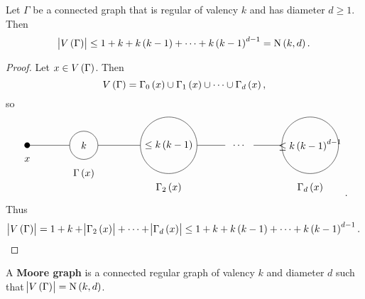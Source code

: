 \begin{proposition}
Let $ \Gamma $ be a connected graph that is regular of valency $ k $ and has diameter $ d \ge 1 $. Then
$$ \abs{V\br{\Gamma}} \le 1 + k + k\br{k - 1} + \dots + k\br{k - 1}^{d - 1} = \N\br{k, d}. $$
\end{proposition}

\begin{proof}
Let $ x \in V\br{\Gamma} $. Then
$$ V\br{\Gamma} = \Gamma_0\br{x} \cup \Gamma_1\br{x} \cup \dots \cup \Gamma_d\br{x}, $$
so
$$
\begin{tikzpicture}
\fill (0, 0) circle (0.1);
\draw (0, -0.5) node{$ x $};
\draw (2, 0) circle (0.5) node{$ k $};
\draw (2, -1) node{$ \Gamma\br{x} $};
\draw (5, 0) circle (1) node{$ \le k\br{k - 1} $};
\draw (5, -1.5) node{$ \Gamma_2\br{x} $};
\draw (7.5, 0) node{$ \dots $};
\draw (10, 0) circle (1) node{$ \le k\br{k - 1}^{d - 1} $};
\draw (10, -1.5) node{$ \Gamma_d\br{x} $};
\draw (0, 0) to (1.5, 0);
\draw (2.5, 0) to (4, 0);
\draw (6, 0) to (7, 0);
\draw (8, 0) to (9, 0);
\end{tikzpicture}.
$$
Thus
$$ \abs{V\br{\Gamma}} = 1 + k + \abs{\Gamma_2\br{x}} + \dots + \abs{\Gamma_d\br{x}} \le 1 + k + k\br{k - 1} + \dots + k\br{k - 1}^{d - 1}. $$
\end{proof}

\begin{definition*}
A \textbf{Moore graph} is a connected regular graph of valency $ k $ and diameter $ d $ such that $ \abs{V\br{\Gamma}} = \N\br{k, d} $.
\end{definition*}

